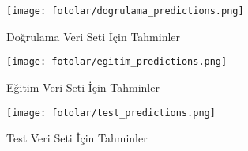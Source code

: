 \documentclass[conference]{IEEEtran}
\begin{document}
\begin{figure}
\centering
\texttt{[image: fotolar/dogrulama\_predictions.png]}
\caption{Doğrulama Veri Seti İçin Tahminler}
\label{fig:validation_predictions}
\end{figure}

\begin{figure}
\centering
\texttt{[image: fotolar/egitim\_predictions.png]}
\caption{Eğitim Veri Seti İçin Tahminler}
\label{fig:training_predictions}
\end{figure}


\begin{figure}
\centering
\texttt{[image: fotolar/test\_predictions.png]}
\caption{Test Veri Seti İçin Tahminler}
\label{fig:test_predictions}
\end{figure}
\end{document}
